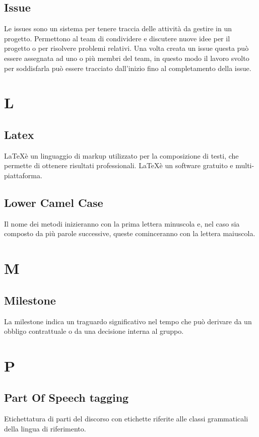 {	\subsection{Issue}
	Le issues sono un sistema per tenere traccia delle attività da gestire in un progetto. Permettono al team di condividere e discutere nuove idee per il progetto o per risolvere problemi relativi. Una volta creata un issue questa può essere assegnata ad uno o più membri del team, in questo modo il lavoro svolto per soddisfarla può essere tracciato dall'inizio fino al completamento della issue.
	
	\section{L}
	\subsection{Latex} 
	\LaTeX è un linguaggio di markup utilizzato per la composizione di testi, che permette di ottenere risultati professionali. \LaTeX è un software gratuito e multi-piattaforma.
	
	\subsection{Lower Camel Case} 
	Il nome dei metodi inizieranno con la prima lettera minuscola e, nel caso sia composto da più parole successive, queste cominceranno con la lettera maiuscola.
	
	\section{M}
	\subsection{Milestone} 
	La milestone indica un traguardo significativo nel tempo che può derivare da un obbligo contrattuale o da una decisione interna al gruppo.
	
	\section{P}
	\subsection{Part Of Speech tagging}
	Etichettatura di parti del discorso con etichette riferite alle classi grammaticali della lingua di riferimento.
	
}

